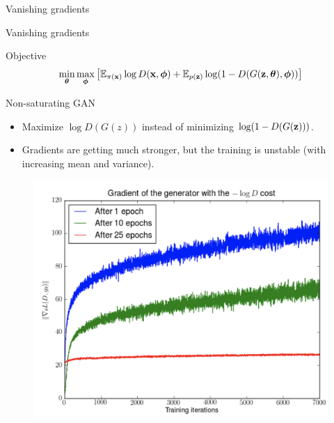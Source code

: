 \begin{frame}{Vanishing gradients}
\begin{minipage}[t]{0.5\columnwidth}
\begin{figure}
		\end{figure}
	\end{minipage}
\end{frame}
\begin{frame}{Vanishing gradients}
	\begin{block}{Objective}
		\vspace{-0.4cm}
		\[
		\min_{\boldsymbol{\theta}} \max_{\boldsymbol{\phi}} \left[ \mathbb{E}_{\pi(\mathbf{x})} \log D(\mathbf{x}, \boldsymbol{\phi}) + \mathbb{E}_{p(\mathbf{z})} \log (1 - D(G(\mathbf{z}, \boldsymbol{\theta}), \boldsymbol{\phi})) \right]
		\]
		\vspace{-0.4cm}
	\end{block}
	\begin{minipage}[t]{0.45\columnwidth}
		\begin{block}{Non-saturating GAN}
			\begin{itemize}
				\item Maximize $\log D(G(z))$ instead of minimizing $\log (1 - D(G(\mathbf{z})))$. \\
				\item Gradients are getting much stronger, but the training is unstable (with increasing mean and variance).
			\end{itemize}
		\end{block}
	\end{minipage}%
	\begin{minipage}[t]{0.55\columnwidth}
		\begin{figure}
			\centering
			\includegraphics[width=1.0\linewidth]{figs/vanishing_gradients_3}
		\end{figure}
	\end{minipage}
\end{frame}
